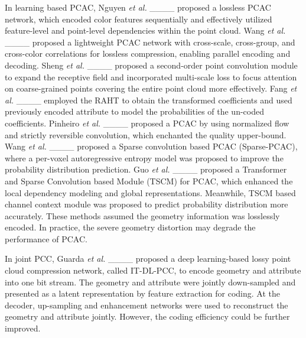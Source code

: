 In learning based PCAC, Nguyen \textit{et al.} ____ proposed a lossless PCAC network, which encoded color features sequentially and effectively utilized feature-level and point-level dependencies within the point cloud. Wang \textit{et al.} ____ proposed a lightweight PCAC network with cross-scale, cross-group, and cross-color correlations for lossless compression, enabling parallel encoding and decoding. Sheng \textit{et al.} ____ proposed a second-order point convolution module to expand the receptive field and incorporated multi-scale loss to focus attention on coarse-grained points covering the entire point cloud more effectively. Fang \textit{et al.} ____ employed the RAHT to obtain the transformed coefficients and used previously encoded attribute to model the probabilities of the un-coded coefficients. Pinheiro \textit{et al.} ____ proposed a PCAC by using normalized flow and strictly reversible convolution, which enchanted the quality upper-bound. Wang \textit{et al.} ____ proposed a Sparse convolution based PCAC (Sparse-PCAC), where a per-voxel autoregressive entropy model was proposed to improve the probability distribution prediction. Guo \textit{et al.} ____ proposed a Transformer and Sparse Convolution based Module (TSCM) for PCAC, which enhanced the local dependency modeling and global representations. Meanwhile, TSCM based channel context module was proposed to predict probability distribution more accurately. These methods assumed the geometry information {was} losslessly encoded. In practice, the severe geometry distortion may degrade the performance of PCAC.

In joint PCC, Guarda \textit{et al.} ____ proposed a deep learning-based lossy point cloud compression network, called IT-DL-PCC, to encode geometry and attribute into one bit stream. The geometry and attribute were jointly down-sampled and presented as a latent representation by feature extraction for coding. At the decoder, up-sampling and enhancement networks were used to reconstruct the geometry and attribute jointly. However, the coding efficiency could be further improved.